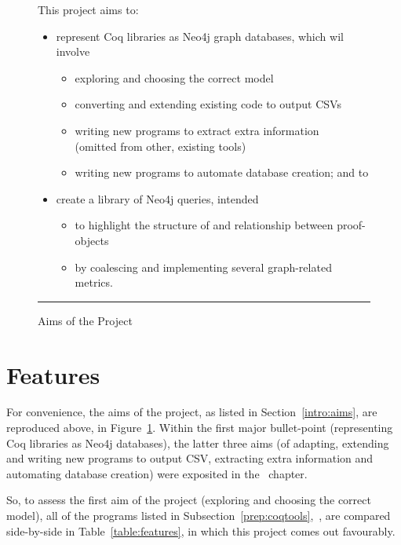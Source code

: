 \begin{figure}[tbp]

  \raggedright
  This project aims to:

  \begin{itemize}
  \item represent Coq libraries as Neo4j graph databases, which wil involve
    \begin{itemize}
    \item exploring and choosing the correct model
    \item converting and extending existing code to output CSVs
    \item writing new programs to extract extra information \\
        (omitted from other, existing tools)
    \item writing new programs to automate database creation; and to
    \end{itemize}

  \item create a library of Neo4j queries, intended
    \begin{itemize}
    \item to highlight the structure of and relationship between proof-objects
    \item by coalescing and implementing several graph-related metrics.
    \end{itemize}
  \end{itemize}

  \hrule%
  \bigskip
  \caption{Aims of the Project}\label{fig:aims}

\end{figure}

\section{Features}\label{eval:compare}

For convenience, the aims of the project, as listed in
Section~\ref{intro:aims}, are reproduced above, in Figure~\ref{fig:aims}.
Within the first major bullet-point (representing Coq libraries as Neo4j
databases), the latter three aims (of adapting, extending and writing new
programs to output CSV, extracting extra information and automating database
creation) were exposited in the~ chapter.

So, to assess the first aim of the project (exploring and choosing the
correct model), all of the programs listed in
Subsection~\ref{prep:coqtools},~, are compared
side-by-side in Table~\ref{table:features}, in which this project comes out
favourably.

